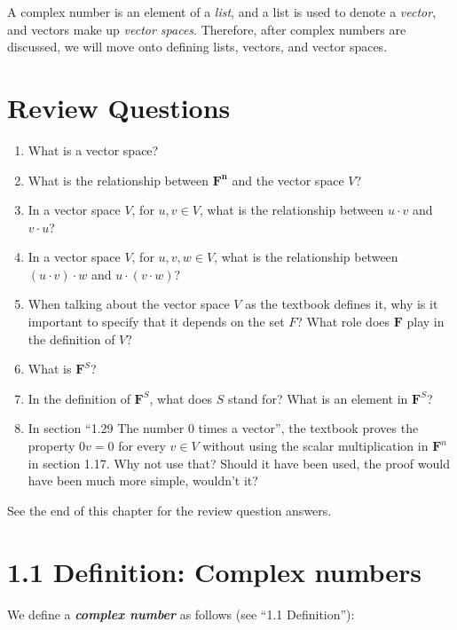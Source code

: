 \documentclass[12pt, letterpaper, oneside]{book}
\begin{document}
A complex number is an element of a \emph{list}, and a list is used to denote a
\emph{vector}, and vectors make up \emph{vector spaces}. Therefore, after
complex numbers are discussed, we will move onto defining lists, vectors, and
vector spaces.

\section*{Review Questions}

\begin{enumerate}
  \item What is a vector space?
  \item What is the relationship between $\mathbf{F^n}$ and the vector space
    $V$?
  \item In a vector space $V$, for $u, v \in V$, what is the relationship
    between $u \cdot v$ and $v \cdot u$?
  \item In a vector space $V$, for $u, v, w \in V$, what is the relationship
  between $(u \cdot v) \cdot w$ and $u \cdot (v \cdot w)$?
  \item When talking about the vector space $V$ as the textbook defines it, why
    is it important to specify that it depends on the set $F$? What role does
    $\mathbf{F}$ play in the definition of $V$?
  \item What is $\mathbf{F}^S$?
  \item In the definition of $\mathbf{F}^S$, what does $S$ stand for? What is
    an element in $\mathbf{F}^S$?
  \item In section ``1.29 The number 0 times a vector'', the textbook proves
    the property $0v = 0$ for every $v \in V$ without using the scalar
    multiplication in $\mathbf{F}^n$ in section 1.17. Why not use that? Should
    it have been used, the proof would have been much more simple, wouldn't it?
\end{enumerate}

See the end of this chapter for the review question answers.

\section*{1.1 Definition: Complex numbers}

We {define} a \textbf{\emph{complex number}} as follows (see
``1.1 Definition''):
\end{document}
